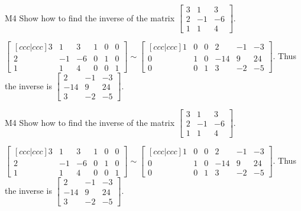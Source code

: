 \begin{problem}{M4}
  Show how to find the inverse of the matrix
  \(\begin{bmatrix}
    3 & 1 & 3  \\
    2 & -1 & -6  \\
    1 & 1 & 4
  \end{bmatrix}\).
\end{problem}
\begin{solution}
\(\begin{bmatrix}[ccc|ccc]
  3 & 1 & 3 & 1 & 0 & 0 \\
  2 & -1 & -6 & 0 & 1 & 0 \\
  1 & 1 & 4 & 0 & 0 & 1
\end{bmatrix}\sim\begin{bmatrix}[ccc|ccc]
  1 & 0 & 0 & 2 & -1 & -3  \\
  0 & 1 & 0 & -14 & 9 & 24  \\
  0 & 0 & 1 & 3 & -2 & -5
\end{bmatrix}\). Thus the inverse is
\(\begin{bmatrix}
  2 & -1 & -3  \\
  -14 & 9 & 24  \\
  3 & -2 & -5
\end{bmatrix}\).
\end{solution}


\begin{problem}{M4}
  Show how to find the inverse of the matrix
  \(\begin{bmatrix}
    3 & 1 & 3  \\
    2 & -1 & -6  \\
    1 & 1 & 4
  \end{bmatrix}\).
\end{problem}
\begin{solution}
\(\begin{bmatrix}[ccc|ccc]
  3 & 1 & 3 & 1 & 0 & 0 \\
  2 & -1 & -6 & 0 & 1 & 0 \\
  1 & 1 & 4 & 0 & 0 & 1
\end{bmatrix}\sim\begin{bmatrix}[ccc|ccc]
  1 & 0 & 0 & 2 & -1 & -3  \\
  0 & 1 & 0 & -14 & 9 & 24  \\
  0 & 0 & 1 & 3 & -2 & -5
\end{bmatrix}\). Thus the inverse is
\(\begin{bmatrix}
  2 & -1 & -3  \\
  -14 & 9 & 24  \\
  3 & -2 & -5
\end{bmatrix}\).
\end{solution}


